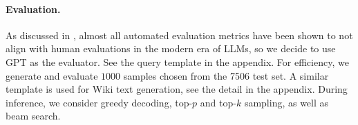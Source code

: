 \vspace{-5pt}
\paragraph{Evaluation.} As discussed in \citet{goyal2022news}, almost all automated evaluation metrics have been shown to not align with human evaluations in the modern era of LLMs, so we decide to use GPT \citep{brown2020language} as the evaluator. See the query template in the appendix.
For efficiency, we generate and evaluate $1000$ samples chosen from the 7506 test set. A similar template is used for Wiki text generation, see the detail in the appendix. During inference, we consider greedy decoding, top-$p$ and top-$k$ sampling, as well as beam search.


\begin{table*}[tb]
\centering
\caption{The win rate of OpenLlama-3B trained with CPO and MLE against the ground truth data in Dolly, sampled by greedy decoding, evaluated by GPT-3.5. $ \normalfont\textsc{MLE}_1$, \textsc{ANR} and \textsc{AN} are trained for 200 steps, the rest models are trained for 1000 steps. The best CPO model outperforms the MLE baseline by 13.8\% win rate.}
\vspace{-0.5em}
\vspace{-0.5em}
\label{table:openllama3beval}
\end{table*} 

\vspace{-5pt}
